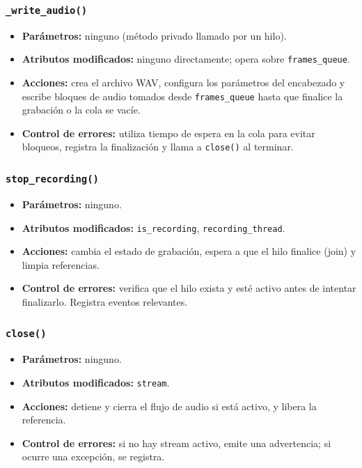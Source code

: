 \subsubsection*{\texttt{\_write\_audio()}}

\begin{itemize}
    \item \textbf{Parámetros:} ninguno (método privado llamado por un hilo).
    \item \textbf{Atributos modificados:} ninguno directamente; opera sobre \texttt{frames\_queue}.
    \item \textbf{Acciones:} crea el archivo WAV, configura los parámetros del encabezado y escribe bloques de audio tomados desde \texttt{frames\_queue} hasta que finalice la grabación o la cola se vacíe.
    \item \textbf{Control de errores:} utiliza tiempo de espera en la cola para evitar bloqueos, registra la finalización y llama a \texttt{close()} al terminar.
\end{itemize}

\subsubsection*{\texttt{stop\_recording()}}

\begin{itemize}
    \item \textbf{Parámetros:} ninguno.
    \item \textbf{Atributos modificados:} \texttt{is\_recording}, \texttt{recording\_thread}.
    \item \textbf{Acciones:} cambia el estado de grabación, espera a que el hilo finalice (join) y limpia referencias.
    \item \textbf{Control de errores:} verifica que el hilo exista y esté activo antes de intentar finalizarlo. Registra eventos relevantes.
\end{itemize}

\subsubsection*{\texttt{close()}}

\begin{itemize}
    \item \textbf{Parámetros:} ninguno.
    \item \textbf{Atributos modificados:} \texttt{stream}.
    \item \textbf{Acciones:} detiene y cierra el flujo de audio si está activo, y libera la referencia.
    \item \textbf{Control de errores:} si no hay stream activo, emite una advertencia; si ocurre una excepción, se registra.
\end{itemize}

